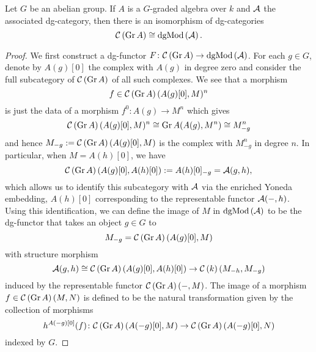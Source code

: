 \begin{lemma}\label{lem:GrModAsMod}
  Let \(G\) be an abelian group.
  If \(A\) is a \(G\)-graded algebra over \(k\) and \(\mathcal{A}\) the associated dg-category, then there is an isomorphism of dg-categories
  \[\mathcal{C}\left(\operatorname{Gr}A\right) \cong \operatorname{dgMod}\left(\mathcal{A}\right).\]

  \begin{proof}
    We first construct a dg-functor \(F \colon \mathcal{C}\left(\operatorname{Gr}A\right) \to \operatorname{dgMod}\left(\mathcal{A}\right)\).
    For each \(g \in G\), denote by \(A(g)[0]\) the complex with \(A(g)\) in degree zero and consider the full subcategory of \(\mathcal{C}\left(\operatorname{Gr}A\right)\) of all such complexes.
    We see that a morphism \[f \in \mathcal{C}\left(\operatorname{Gr}A\right)(A(g)[0],M)^n\] is just the data of a morphism \(f^0 \colon A(g) \to M^n\) which gives
    \[\mathcal{C}\left(\operatorname{Gr}A\right)(A(g)[0],M)^n \cong \operatorname{Gr}A(A(g), M^n) \cong M^n_{-g}\]
    and hence \(M_{-g} := \mathcal{C}\left(\operatorname{Gr}A\right)(A(g)[0], M)\) is the complex with \(M^n_{-g}\) in degree \(n\).
    In particular, when \(M = A(h)[0]\), we have
    \[\mathcal{C}\left(\operatorname{Gr}A\right)(A(g)[0],A(h)[0]) := A(h)[0]_{-g} = \mathcal{A}(g,h),\]
    which allows us to identify this subcategory with \(\mathcal{A}\) via the enriched Yoneda embedding, \(A(h)[0]\) corresponding to the representable functor \(\mathcal{A}(-,h)\).
    Using this identification, we can define the image of \(M\) in \(\operatorname{dgMod}\left(\mathcal{A}\right)\) to be the dg-functor that takes an object \(g \in G\) to
    \[M_{-g} = \mathcal{C}\left(\operatorname{Gr}A\right)(A(g)[0], M)\]
    with structure morphism
    \[\mathcal{A}(g,h) \cong \mathcal{C}\left(\operatorname{Gr}A\right)(A(g)[0], A(h)[0]) \to \mathcal{C}\left(k\right)(M_{-h}, M_{-g})\]
    induced by the representable functor \(\mathcal{C}\left(\operatorname{Gr}A\right)(-, M)\).
    The image of a morphism \(f \in \mathcal{C}\left(\operatorname{Gr}A\right)(M,N)\) is defined to be the natural transformation given by the collection of morphisms
    \[h^{A(-g)[0]}(f) \colon \mathcal{C}\left(\operatorname{Gr}A\right)(A(-g)[0], M) \to \mathcal{C}\left(\operatorname{Gr}A\right)(A(-g)[0],N)\]
    indexed by \(G\).


\end{proof}
\end{lemma}
